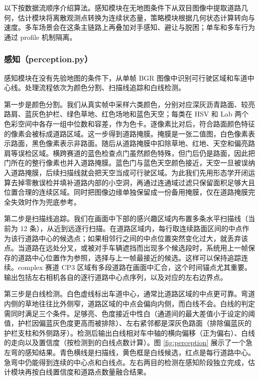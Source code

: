 \documentclass[UTF8,a4paper]{ctexart}
\begin{document}
以下按数据流顺序介绍算法。感知模块在无地图条件下从双目图像中提取道路几何，估计模块将离散观测点转换为连续状态量，策略模块根据几何状态计算转向与速度。多车场景会在这条主链路上再叠加对手感知、避让与脱困；单车和多车行为通过 profile 机制隔离。

\subsubsection{感知（perception.py）}\label{sec:perception}

感知模块在没有先验地图的条件下，从单帧 BGR 图像中识别可行驶区域和车道中心线。处理流程依次为颜色分割、扫描线追踪和白线检测。

第一步是颜色分割。我们从真实帧中采样六类颜色，分别对应深灰沥青路面、较亮路肩、蓝灰色护栏、绿色草地、红色场地和蓝色天空；每类在 HSV 和 Lab 两个色彩空间中各存一组中位数和容差，作为色卡。逐像素比对后，符合路面颜色特征的像素会被标成道路区域。这一步得到道路掩膜。掩膜是一张二值图，白色像素表示路面，黑色像素表示非路面。随后从道路掩膜中扣除草地、红地、天空和偏亮路肩等误检区域。横跨赛道的蓝色检查点门虽然颜色特殊，但门后仍是路面，因此把门所在的整行像素也并入道路掩膜。蓝色门与蓝色天空颜色接近，天空一旦被误纳入道路掩膜，后续扫描线就会把天空当成可行驶区域。为此我们先用形态学开闭运算去掉零散误检并填补道路内部的小空洞，再通过连通域过滤只保留面积足够大且位置合理的连续区域。同时把图像边缘单独保留成一份备用掩膜，仅在道路掩膜完全失效时作为兜底参考。

第二步是扫描线追踪。我们在画面中下部的感兴趣区域内布置多条水平扫描线（当前为 12 条），从近到远逐行扫描。在道路区域内，每行取连续路面区间的中点作为该行道路中心的候选点；如果相邻行之间的中点位置突然变化过大，就丢弃该点。当道路在远处分叉，或被对手车辆遮挡而出现多个候选段时，系统用上一帧保存的道路中心位置作为参照，选择与上一帧最接近的候选。这样可以保持追踪连续。complex 赛道 CP3 区域有多段道路在画面中汇合，这个时间锚点尤其重要。输出包括左右相机各自的逐行道路中心点序列，以及对应的左右边界点。

第三步是白线检测。白色虚线标出车道中心，通常比道路区域的中点更可靠。弯道内侧的草地往往比外侧窄，道路区域的中点会偏向内侧，而白线不会。白线的判定需同时满足三个条件。足够亮、色度接近中性白（通道间的最大差值小于设定的阈值，护栏因偏蓝灰色度更高而被排除）、左右紧邻都是深灰色路面（排除偏蓝灰的护栏支柱和外侧路牙）。检测后输出白线相对车中轴的横向偏移（正为偏右）、白线的走向以及置信度（按检测到的白线点数计算）。图 \ref{fig:perception} 展示了一个急左弯的感知结果。青色横线是扫描线，黄色框是白线候选，红点是每行道路中心。急弯中仍能得到连续的中心点和白线点。左右两目的检测在感知阶段独立完成，估计模块再按白线置信度和道路点数量融合结果。
\end{document}
